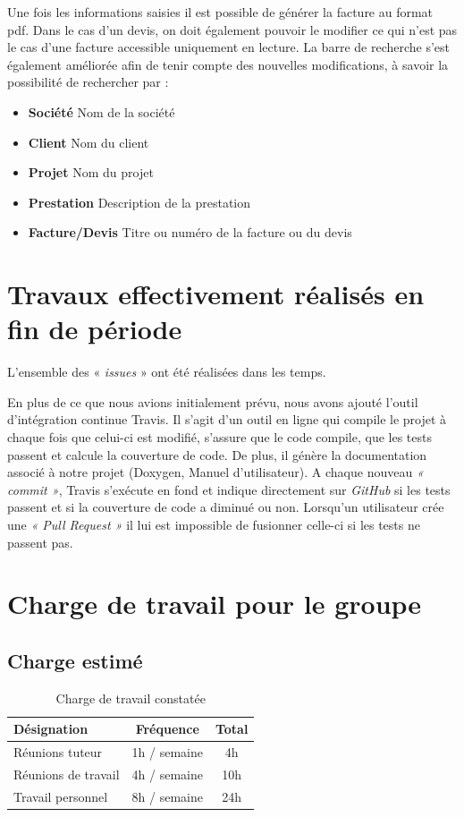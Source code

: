 \documentclass[12pt,a4paper,openany]{article}
\begin{document}
	Une fois les informations saisies il est possible de générer la facture au format pdf.
	Dans le cas d'un devis, on doit également pouvoir le modifier ce qui n'est pas le cas d'une facture accessible uniquement en lecture.
	La barre de recherche s'est également améliorée afin de tenir compte des nouvelles modifications, à savoir la possibilité de rechercher par : 
	\begin{itemize}
		\item \textbf{Société} Nom de la société
		\item \textbf{Client} Nom du client
		\item \textbf{Projet} Nom du projet
		\item \textbf{Prestation} Description de la prestation
		\item \textbf{Facture/Devis} Titre ou numéro de la facture ou du devis
	\end{itemize}  
	
	\section{Travaux effectivement réalisés en fin de période}\label{work}
	L'ensemble des « \textit{issues} » ont été réalisées dans les temps. 

	En plus de ce que nous avions initialement prévu, nous avons ajouté l'outil d'intégration continue Travis. Il s'agit d'un outil en ligne qui compile le projet à chaque fois que celui-ci est modifié, s'assure que le code compile, que les tests passent et calcule la couverture de code. De plus, il génère la documentation associé à notre projet (Doxygen, Manuel d'utilisateur).
	A chaque nouveau \textit{ « commit »}, Travis s'exécute en fond et indique directement sur \textit{GitHub} si les tests passent et si la couverture de code a diminué ou non. Lorsqu'un utilisateur crée une \textit{« Pull Request »} il lui est impossible de fusionner celle-ci si les tests ne passent pas. 

	\section{Charge de travail pour le groupe}
	\subsection{Charge estimé}
	\begin{table}[H]
		\centering
		\begin{tabular}{l|c|c}
			\textbf{Désignation} & \textbf{Fréquence} & \textbf{Total}\\
			\hline
			Réunions tuteur & 1h / semaine & 4h\\
			Réunions de travail & 4h / semaine & 10h\\
			Travail personnel & 8h / semaine & 24h
		\end{tabular}
		\caption{Charge de travail constatée}
	\end{table}
\end{document}
